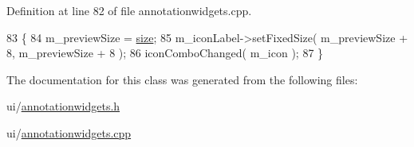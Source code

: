 Definition at line 82 of file annotationwidgets.\+cpp.


\begin{DoxyCode}
83 \{
84     m\_previewSize = \hyperlink{synctex__parser_8c_aa23c661441688350614bd6a350d2b6ff}{size};
85     m\_iconLabel->setFixedSize( m\_previewSize + 8, m\_previewSize + 8 );
86     iconComboChanged( m\_icon );
87 \}
\end{DoxyCode}


The documentation for this class was generated from the following files\+:\begin{DoxyCompactItemize}
\item 
ui/\hyperlink{annotationwidgets_8h}{annotationwidgets.\+h}\item 
ui/\hyperlink{annotationwidgets_8cpp}{annotationwidgets.\+cpp}\end{DoxyCompactItemize}
